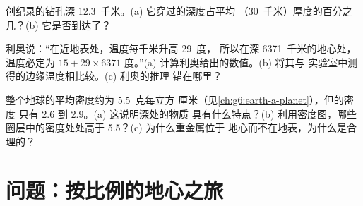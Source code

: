 \begin{exercise}[$\star\star$]\label{exo:g6:inside-the-earth:10}
创纪录的钻孔深 12.3~千米。(a) 它穿过的深度占平均
（30~千米）厚度的百分之几？(b) 它是否到达了？
\end{exercise}

\begin{exercise}[$\star\star\star$]\label{exo:g6:inside-the-earth:11}
利奥说：“在近地表处，温度每千米升高 29~度，
所以在深 6371~千米的地心处，温度必定为
$15 + 29 \times 6371$ 度。”(a) 计算利奥给出的数值。(b) 将其与
实验室中测得的边缘温度相比较。(c) 利奥的推理
错在哪里？
\end{exercise}

\begin{exercise}[$\star\star\star$]\label{exo:g6:inside-the-earth:12}
整个地球的平均密度约为 5.5~克每立方
厘米（见\cref{ch:g6:earth-a-planet}），但的密度
只有 2.6 到 2.9。(a) 这说明深处的物质
具有什么特点？(b) 利用密度图，哪些圈层中的密度处处高于 5.5？(c) 为什么重金属位于
地心而不在地表，为什么是合理的？
\end{exercise}

\section{问题：按比例的地心之旅}

